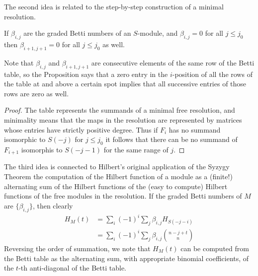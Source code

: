 The second idea is related to the step-by-step construction of a minimal resolution.
\begin{proposition}\label{zero implications}
If $\beta_{i,j}$ are the graded Betti numbers of an $S$-module, and $\beta_{i,j} = 0$ for all $j\leq j_{0}$ then
$\beta_{i+1, j+1} = 0$ for all $j\leq j_{0}$ as well.
\end{proposition}

Note that $\beta_{i,j}$ and $\beta_{i+1,j+1}$ are consecutive elements of the same row of the Betti
table, so the Proposition says that a zero entry in the $i$-position of all the rows of the table at and above
a certain spot implies that all successive entries
of those rows are zero as well.

\begin{proof}
The table represents the summands of a minimal free resolution, and minimality means that the maps in the resolution are represented by matrices whose entries have strictly positive degree. Thus if
$F_{i}$ has no summand isomorphic to $S(-j)$ for $j\leq j_{0}$ it follows that there can be no summand
of $F_{i+1}$ isomorphis to $S(-j-1)$ for the same range of $j$.
\end{proof}

The third idea is connected to Hilbert's original application of the Syzygy Theorem the computation of the Hilbert function of a module as a (finite!) alternating sum of the Hilbert functions of the (easy to compute) Hilbert functions of the free modules in the resolution. If the graded Betti numbers of $M$ are $\{\beta_{i,j}\}$, then clearly
\begin{align*}
 H_{M}(t) &= \sum_{i}(-1)^{i}\sum_{j}\beta_{i,j}H_{S(-j-i)}\\
 &= \sum_{i}(-1)^{i}\sum_{j}\beta_{i,j}{n-j+t\choose n}
\end{align*}
Reversing the order of summation, we note that $H_{M}(t)$ can be computed from the Betti table as the 
alternating sum, with appropriate binomial coefficients, of the $t$-th anti-diagonal of the Betti table. 

